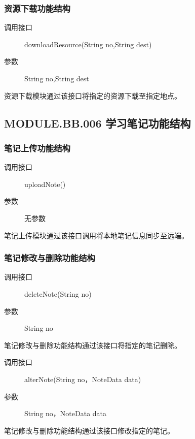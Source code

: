   \subsubsection{资源下载功能结构}
  \begin{description}
    \item[调用接口]downloadResource(String no,String dest)
    \item[参数]String no,String dest
  \end{description}
  资源下载模块通过该接口将指定的资源下载至指定地点。

\subsection{MODULE.BB.006 学习笔记功能结构}
  \subsubsection{笔记上传功能结构}
  \begin{description}
    \item[调用接口]uploadNote()
    \item[参数]无参数
  \end{description}
  笔记上传模块通过该接口调用将本地笔记信息同步至远端。
  \subsubsection{笔记修改与删除功能结构}
  \begin{description}
    \item[调用接口]deleteNote(String no)
    \item[参数]String no
  \end{description}
  笔记修改与删除功能结构通过该接口将指定的笔记删除。
  \begin{description}
    \item[调用接口]alterNote(String no，NoteData data)
    \item[参数]String no，NoteData data
  \end{description}
  笔记修改与删除功能结构通过该接口修改指定的笔记。
